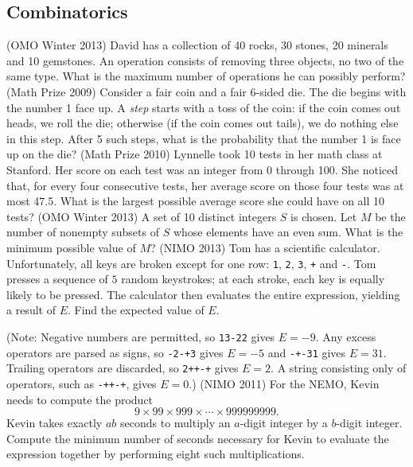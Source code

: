 \documentclass[11pt]{scrartcl}
\begin{document}
\subsection{Combinatorics}
\begin{enumerate}[\bfseries {C}1.]
  \ii %
    (OMO Winter 2013) David has a collection of 40 rocks, 30 stones, 20 minerals and 10 gemstones. An operation consists of removing three objects, no two of the same type. What is the maximum number of operations he can possibly perform?
  \ii %
    (Math Prize 2009) Consider a fair coin and a fair 6-sided die.  The die begins with the number 1 face up.  A \textit{step} starts with a toss of the coin: if the coin comes out heads, we roll the die; otherwise (if the coin comes out tails), we do nothing else in this step.  After 5 such steps, what is the probability that the number 1 is face up on the die?
  \ii %
    (Math Prize 2010) Lynnelle took 10 tests in her math class at Stanford. Her score on each test was an integer from 0 through 100. She noticed that, for every four consecutive tests, her average score on those four tests was at most 47.5. What is the largest possible average score she could have on all 10 tests?
  \ii %
    (OMO Winter 2013) A set of 10 distinct integers $S$ is chosen. Let $M$ be the number of nonempty subsets of $S$ whose elements have an even sum. What is the minimum possible value of $M$?
  \ii %
    (NIMO 2013) Tom has a scientific calculator. Unfortunately, all keys are broken except for one row: \verb$1$, \verb$2$, \verb$3$, \verb$+$ and \verb$-$.
    Tom presses a sequence of $5$ random keystrokes; at each stroke, each key is equally likely to be pressed.  The calculator then evaluates the entire expression, yielding a result of $E$.  Find the expected value of $E$. \par (Note: Negative numbers are permitted, so \verb$13-22$ gives $E = -9$. Any excess operators are parsed as signs, so \verb$-2-+3$ gives $E=-5$ and \verb$-+-31$ gives $E = 31$.  Trailing operators are discarded, so \verb$2++-+$ gives $E=2$.  A string consisting only of operators, such as \verb$-++-+$, gives $E=0$.)
  \ii %
    (NIMO 2011) For the NEMO, Kevin needs to compute the product \[ 9 \times 99 \times 999 \times \cdots \times 999999999. \]  Kevin takes exactly $ab$ seconds to multiply an $a$-digit integer by a $b$-digit integer. Compute the minimum number of seconds necessary for Kevin to evaluate the expression together by performing eight such multiplications.

\end{enumerate}
\end{document}
